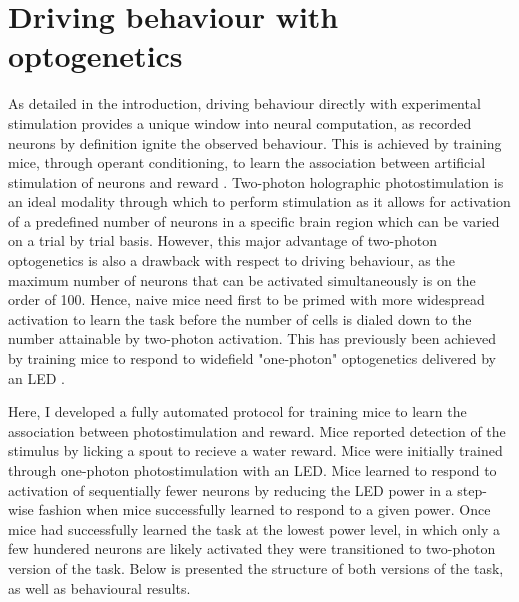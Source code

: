 \chapter{\label{behaviour} Driving behaviour with optogenetics}

\minitoc



As detailed in the introduction, driving behaviour directly with experimental stimulation provides a unique window into neural computation, as recorded neurons by definition ignite the observed behaviour. This is achieved by training mice, through operant conditioning, to learn the association between artificial stimulation of neurons and reward \cite{huber_sparse_2008, houweling_behavioural_2008, histed_cortical_2014, dalgleish_how_2020, gill_precise_2020}. Two-photon holographic photostimulation is an ideal modality through which to perform stimulation as it allows for activation of a predefined number of neurons in a specific brain region which can be varied on a trial by trial basis. However, this major advantage of two-photon optogenetics is also a drawback with respect to driving behaviour, as the maximum number of neurons that can be activated simultaneously is on the order of 100. Hence, naive mice need first to be primed with more widespread activation to learn the task before the number of cells is dialed down to the number attainable by two-photon activation. This has previously been achieved by training mice to respond to widefield "one-photon" optogenetics delivered by an LED \cite{dalgleish_how_2020, gill_precise_2020}.

Here, I developed a fully automated protocol for training mice to learn the association between photostimulation and reward. Mice reported detection of the stimulus by licking a spout to recieve a water reward. Mice were initially trained through one-photon photostimulation with an LED. Mice learned to respond to activation of sequentially fewer neurons by reducing the LED power in a step-wise fashion when mice successfully learned to respond to a given power. Once mice had successfully learned the task at the lowest power level, in which only a few hundered neurons are likely activated \cite{huber_sparse_2008} they were transitioned to two-photon version of the task. Below is presented the structure of both versions of the task, as well as behavioural results. 

